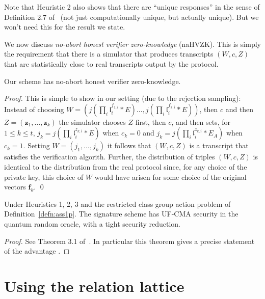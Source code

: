 \documentclass{llncs}
\renewcommand{\l}{\mathfrak{l}}
\newcommand{\f}{\mathbf{f}}
\newcommand{\z}{\mathbf{z}}
\begin{document}
Note that Heuristic 2 also shows that there are ``unique responses'' in the sense of Definition 2.7 of~\cite{KLS18} (not just computationally unique, but actually unique). But we won't need this for the result we state.


We now discuss \emph{no-abort honest verifier zero-knowledge} (naHVZK).
This is simply the requirement that there is a simulator that produces transcripts $(W,c,Z)$ that are statistically close to real transcripts output by the protocol.


\begin{lemma}
Our scheme has no-abort honest verifier zero-knowledge.
\end{lemma}

\begin{proof}
This is simple to show in our setting (due to the rejection sampling): Instead of choosing $W = ( j(\prod_i \l_i^{f_{1,i}} * E) \dots, j( \prod_i \l_i^{f_{k,i}} * E ))$, then $c$ and then $Z = (\z_1, \dots, \z_k)$ the simulator chooses $Z$ first, then $c$, and then sets, for $1 \le k \le t$, $j_k = j( \prod_i \l_i^{z_{k,i}} * E )$ when $c_k=0$ and $j_k = j( \prod_i \l_i^{z_{k,i}} * E_A )$ when $c_k = 1$.
Setting $W = (j_1,\dots, j_k)$ it follows that $(W, c, Z )$ is a transcript that satisfies the verification algorith.
Further, the distribution of triples $(W,c,Z)$ is identical to the distribution from the real protocol since, for any choice of the private key, this choice of $W$ would have arisen for some choice of the original vectors $\f_k$. \qed
\end{proof}




\begin{theorem}
Under Heuristics 1, 2, 3 and the restricted class group action problem of Definition~\ref{defn:ass1p}.
The signature scheme has UF-CMA security in the quantum random oracle, with a tight security reduction.
\end{theorem}
 

\begin{proof}
See Theorem 3.1 of~\cite{KLS18}.
In particular this theorem gives a precise statement of the advantage .
\end{proof}





\section{Using the relation lattice}\label{sec:sig-relation-lattice}
\end{document}
